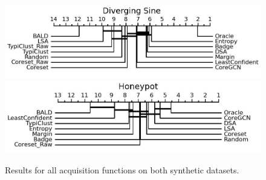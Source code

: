 \begin{figure}
	\centering
	\caption{Results for all acquisition functions on both synthetic datasets.}
	\label{fig:main_body_result}
	\includegraphics[width=0.49\linewidth]{img/micro_diverging_sin.jpg}
	\includegraphics[width=0.49\linewidth]{img/micro_honeypot.jpg}
\end{figure}

